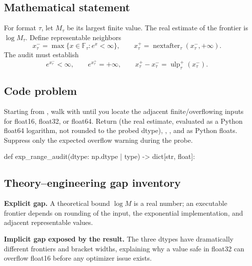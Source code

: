 
        \subsection{Mathematical statement}


For format $\tau$, let $M_\tau$ be its largest finite value.  The real estimate
of the frontier is $\log M_\tau$.  Define representable neighbors
\[
  x^-_\tau=\max\{x\in\mathbb F_\tau:e^x<\infty\},\qquad
  x^+_\tau=\operatorname{nextafter}_\tau(x^-_\tau,+\infty).
\]
The audit must establish
\[
e^{x^-_\tau}<\infty,\qquad e^{x^+_\tau}=+\infty,\qquad
x^+_\tau-x^-_\tau=\operatorname{ulp}^+_\tau(x^-_\tau).
\]


        \subsection{Code problem}


Starting from , walk with  until you locate
the adjacent finite/overflowing inputs for float16, float32, or float64.  Return
 (the real estimate, evaluated as a Python float64 logarithm,
not rounded to the probed dtype), , , and
 as Python floats.  Suppress only the expected overflow
warning during the probe.


        \begin{contractbox}
        \begin{Code}
        def exp_range_audit(dtype: np.dtype | type) -> dict[str, float]:
        \end{Code}
        \end{contractbox}

        \subsection{Theory--engineering gap inventory}

        \begin{gapbox}
        \textbf{Explicit gap.} A theoretical bound $\log M$ is a real number; an executable frontier depends on rounding of the input, the exponential implementation, and adjacent representable values.

        \textbf{Implicit gap exposed by the result.} The three dtypes have dramatically different frontiers and bracket widths, explaining why a value safe in float32 can overflow float16 before any optimizer issue exists.
        \end{gapbox}

